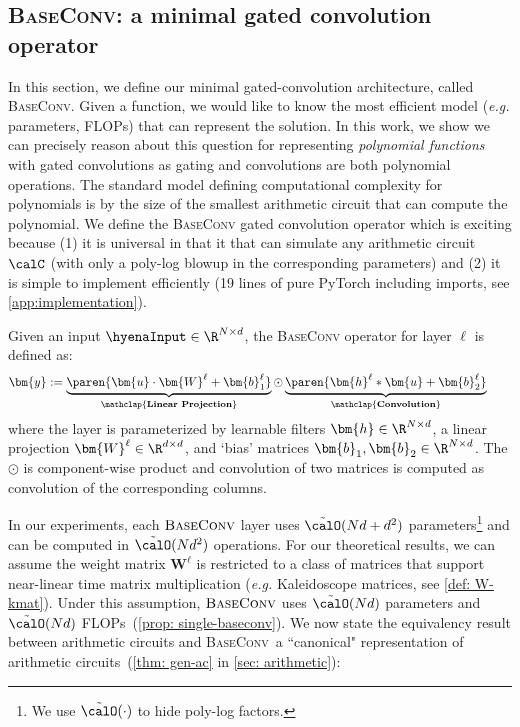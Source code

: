 \subsection{\textsc{BaseConv}: a minimal gated convolution operator}
\label{sec:theory-coyote-def}
In this section, we define our minimal gated-convolution architecture, called \textsc{BaseConv}.
Given a function, we would like to know the most efficient model (\textit{e.g.} parameters, FLOPs) that can represent the solution. In this work, we show we can precisely reason about this question for representing \textit{polynomial functions} with gated convolutions as gating and convolutions are both polynomial operations. The standard model defining computational complexity for polynomials is by the size of the smallest arithmetic circuit that can compute the polynomial. We define the {\textsc{BaseConv}} gated convolution operator which is exciting because (1) it is universal in that it that can simulate any arithmetic circuit $\calC$ (with only a poly-log blowup in the corresponding parameters) and (2) it is simple to implement efficiently (19 lines of pure PyTorch including imports, see \ref{app:implementation}).

\begin{definition} Given an input $\hyenaInput\in \R^{N \times d}$, the {\textsc{BaseConv}} operator for layer $\ell$ is defined as:
    \begin{equation}
        \label{eq: coyote-recursion}
        \begin{aligned}
            \bm{y}
            &:= 
            \underbrace{\paren{\bm{u} \cdot \bm{W}^\ell+\bm{b}_1^{\ell}}}_{\mathclap{\textbf{Linear Projection}}}
            \odot 
            \underbrace{\paren{\bm{h}^{\ell} \ast \bm{u}+\bm{b}_2^{\ell}}}_{\mathclap{\textbf{Convolution}}}
            \quad 
        \end{aligned}
    \end{equation}
    where the layer is parameterized by learnable filters $\bm{h}\in\R^{N\times d}$, a linear projection $\bm{W}^\ell\in\R^{d\times d}$, and `bias' matrices $\bm{b}_1,\bm{b}_2\in\R^{N\times d}$. The $\odot$ is component-wise product and convolution of two matrices is computed as convolution of the corresponding columns.
\end{definition}

In our experiments, each ${\textsc{BaseConv}}$ layer uses $\tilde{\calO}(Nd + d^2)$ parameters\footnote{We use $\tilde{\calO}{(\cdot)}$ to hide poly-log factors.} and can be computed in $\tilde{\calO}(Nd^2)$ operations. For our theoretical results, we can assume the weight matrix $\bm{W}^\ell$ is restricted to a class of matrices that support near-linear time matrix multiplication (\textit{e.g.} Kaleidoscope matrices, see \ref{def: W-kmat}). Under this assumption, ${\textsc{BaseConv}}$ uses $\tilde{\calO}(Nd)$ parameters and $\tilde{\calO}(Nd)$ FLOPs~(\ref{prop: single-baseconv}). We now state the equivalency result between arithmetic circuits and \textsc{BaseConv}\,  a ``canonical" representation of arithmetic circuits~(\ref{thm: gen-ac} in \ref{sec: arithmetic}):


